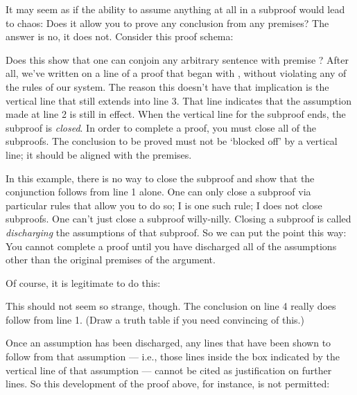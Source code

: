 It may seem as if the ability to assume anything at all in a subproof would lead to chaos: Does it allow you to prove any conclusion from any premises? The answer is no, it does not. Consider this proof schema:

\begin{ndproof}
	\metaA{}
	\open
		\metaB{}
		 
	\close
\end{ndproof}

Does this show that one can conjoin any arbitrary sentence \metaB{} with premise \metaA{}? After all, we've written \metaB{}\eand\metaA{} on a line of a proof that began with \metaA{}, without violating any of the rules of our system. The reason this doesn't have that implication is the vertical line that still extends into line 3. That line indicates that the assumption made at line 2 is still in effect. When the vertical line for the subproof ends, the subproof is \emph{closed}. In order to complete a proof, you must close all of the subproofs. The conclusion to be proved must not be `blocked off' by a vertical line; it should be aligned with the premises.

In this example, there is no way to close the subproof and show that the conjunction follows from line 1 alone. One can only close a subproof via particular rules that allow you to do so; {\eif}I is one such rule; {\eand}I does not close subproofs. One can't just close a subproof willy-nilly. Closing a subproof is called \emph{discharging} the assumptions of that subproof. So we can put the point this way: You cannot complete a proof until you have discharged all of the assumptions other than the original premises of the argument.

Of course, it is legitimate to do this:

\begin{ndproof}
	\metaA{}
	\open
		\metaB{}
		 
	\close
	 
\end{ndproof}

This should not seem so strange, though. The conclusion on line 4 really does follow from line 1. (Draw a truth table if you need convincing of this.) 

Once an assumption has been discharged, any lines that have been shown to follow from that assumption --- i.e., those lines inside the box indicated by the vertical line of that assumption --- cannot be cited as justification on further lines. So this development of the proof above, for instance, is not permitted:

